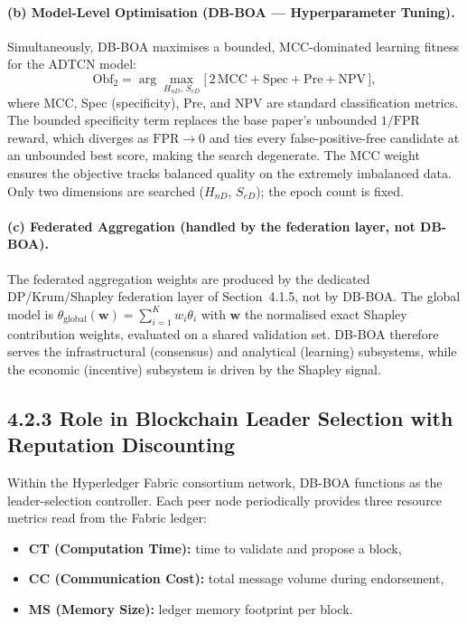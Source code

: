 \paragraph{(b) Model-Level Optimisation (DB-BOA — Hyperparameter Tuning).}
Simultaneously, DB-BOA maximises a bounded, MCC-dominated learning fitness for the ADTCN model:
\begin{equation}\label{eq:obf2}
    \mathrm{Obf}_2 = \arg\max_{H_{nD},\, S_{eD}} \big[\, 2\,\mathrm{MCC} + \mathrm{Spec} + \mathrm{Pre} + \mathrm{NPV} \,\big],
\end{equation}
where MCC, Spec (specificity), Pre, and NPV are standard classification metrics. The bounded specificity term replaces the base paper's unbounded $1/\mathrm{FPR}$ reward, which diverges as $\mathrm{FPR}\to 0$ and ties every false-positive-free candidate at an unbounded best score, making the search degenerate. The MCC weight ensures the objective tracks balanced quality on the extremely imbalanced data. Only two dimensions are searched ($H_{nD}$, $S_{eD}$); the epoch count is fixed.

\paragraph{(c) Federated Aggregation (handled by the federation layer, not DB-BOA).}
The federated aggregation weights are produced by the dedicated DP/Krum/Shapley federation layer of Section~4.1.5, not by DB-BOA. The global model is $\theta_{\text{global}}(\mathbf{w}) = \sum_{i=1}^{K} w_i \theta_i$ with $\mathbf{w}$ the normalised exact Shapley contribution weights, evaluated on a shared validation set. DB-BOA therefore serves the infrastructural (consensus) and analytical (learning) subsystems, while the economic (incentive) subsystem is driven by the Shapley signal.

\subsection*{4.2.3 Role in Blockchain Leader Selection with Reputation Discounting}

Within the Hyperledger Fabric consortium network, DB-BOA functions as the leader-selection controller. Each peer node periodically provides three resource metrics read from the Fabric ledger:
\begin{itemize}
    \item \textbf{CT (Computation Time):} time to validate and propose a block,
    \item \textbf{CC (Communication Cost):} total message volume during endorsement,
    \item \textbf{MS (Memory Size):} ledger memory footprint per block.
\end{itemize}

